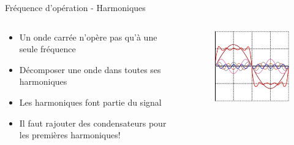 \begin{frame}{Fréquence d'opération - Harmoniques}
    \begin{columns}
        \begin{column}{0.45\textwidth}
            \begin{itemize}
                \item Un onde carrée n'opère pas qu'à une seule fréquence
                \item Décomposer une onde dans toutes ses harmoniques
                \item Les harmoniques font partie du signal
                \bigskip
                \item Il faut rajouter des condensateurs pour les premières harmoniques!
            \end{itemize}
        \end{column}
        \begin{column}{0.55\textwidth}
            \begin{figure}
                \includegraphics[width=\textwidth, height=0.75\textheight, keepaspectratio]{pictures/square-wave-harmonic-series.png}
            \end{figure}
        \end{column}
    \end{columns}
\end{frame}

